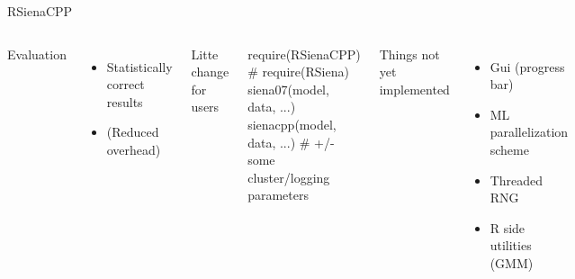 \documentclass[]{beamer}                                                %
\def\scriptsize{\fontsize{7pt}{8pt}\selectfont}
\begin{document}
\begin{frame}[fragile]{RSienaCPP}
\begin{columns}[t]
    Evaluation
    \begin{itemize}
      \item Statistically correct results
      \item (Reduced overhead)
    \end{itemize}
    Litte change for users
    \begin{semiverbatim}\scriptsize
  require(RSienaCPP) # require(RSiena)
  siena07(model, data, ...)
  sienacpp(model, data, ...)
  # +/- some cluster/logging parameters
    \end{semiverbatim}\vspace{-.6em}
    \vspace{5em}
    Things not yet implemented
    \begin{itemize}
      \item Gui (progress bar)
      \item ML parallelization scheme
      \item Threaded RNG
      \item R side utilities (GMM)
    \end{itemize}

  \end{columns}
\end{frame}

\end{document}
